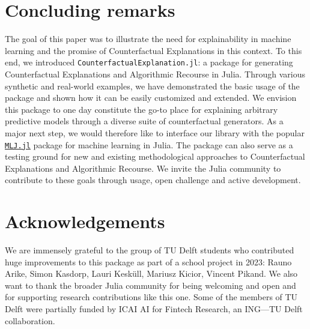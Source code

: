 \documentclass{juliacon}
\begin{document}
\hypertarget{sec-conclude}{%
\section{Concluding remarks}\label{sec-conclude}}

The goal of this paper was to illustrate the need for explainability in
machine learning and the promise of Counterfactual Explanations in this
context. To this end, we introduced
\texttt{CounterfactualExplanation.jl}: a package for generating
Counterfactual Explanations and Algorithmic Recourse in Julia. Through
various synthetic and real-world examples, we have demonstrated the
basic usage of the package and shown how it can be easily customized and
extended. We envision this package to one day constitute the go-to place
for explaining arbitrary predictive models through a diverse suite of
counterfactual generators. As a major next step, we would therefore like
to interface our library with the popular
\href{https://alan-turing-institute.github.io/MLJ.jl/dev/}{\texttt{MLJ.jl}}
package for machine learning in Julia. The package can also serve as a
testing ground for new and existing methodological approaches to
Counterfactual Explanations and Algorithmic Recourse. We invite the
Julia community to contribute to these goals through usage, open
challenge and active development.

\hypertarget{sec-ack}{%
\section{Acknowledgements}\label{sec-ack}}

We are immensely grateful to the group of TU Delft students who
contributed huge improvements to this package as part of a school
project in 2023: Rauno Arike, Simon Kasdorp, Lauri Kesküll, Mariusz
Kicior, Vincent Pikand. We also want to thank the broader Julia
community for being welcoming and open and for supporting research
contributions like this one. Some of the members of TU Delft were
partially funded by ICAI AI for Fintech Research, an ING---TU Delft
collaboration.


\end{document}
